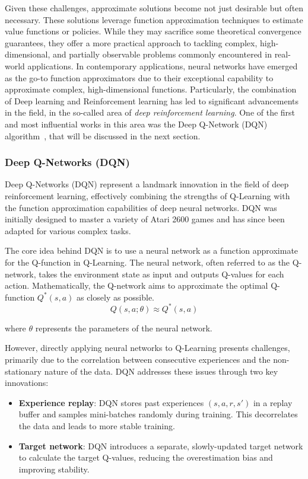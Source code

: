 Given these challenges, approximate solutions become not just desirable but often necessary. 
 These solutions leverage function approximation techniques to estimate value functions or policies. 
 While they may sacrifice some theoretical convergence guarantees, 
 they offer a more practical approach to tackling complex, high-dimensional, and partially observable problems commonly encountered in real-world applications.
%
In contemporary applications, neural networks have emerged as the go-to function approximators due to their exceptional capability to approximate complex, 
 high-dimensional functions. 
 Particularly, the combination of Deep learning and Reinforcement learning has led to significant advancements in the field, in the so-called area of \emph{deep reinforcement learning}.
 One of the first and most influential works in this area was the Deep Q-Network (DQN) algorithm~\cite{DBLP:journals/corr/MnihKSGAWR13}, that will be discussed in the next section.
 \subsubsection{Deep Q-Networks (DQN)}

 Deep Q-Networks (DQN) represent a landmark innovation in the field of deep reinforcement learning, 
  effectively combining the strengths of Q-Learning with the function approximation capabilities of deep neural networks.
  DQN was initially designed to master a variety of Atari 2600 games and has since been adapted for various complex tasks.
 
 The core idea behind DQN is to use a neural network as a function approximate for the Q-function in Q-Learning. 
  The neural network, often referred to as the Q-network, 
  takes the environment state as input and outputs Q-values for each action.
%  
Mathematically, the Q-network aims to approximate the optimal Q-function \(Q^*(s, a)\) 
 as closely as possible.
\begin{equation}
Q(s, a; \theta) \approx Q^*(s, a)
\end{equation}
 
where \(\theta\) represents the parameters of the neural network.
 
However, directly applying neural networks to Q-Learning presents challenges, 
 primarily due to the correlation between consecutive experiences and the non-stationary nature of the data. 
 DQN addresses these issues through two key innovations:
 
\begin{itemize}
  \item \textbf{Experience replay}: DQN stores past experiences \((s, a, r, s')\) in a replay buffer and samples mini-batches randomly during training. 
  This decorrelates the data and leads to more stable training.
  \item \textbf{Target network}: DQN introduces a separate, 
  slowly-updated target network to calculate the target Q-values, 
  reducing the overestimation bias and improving stability.
\end{itemize}
 
